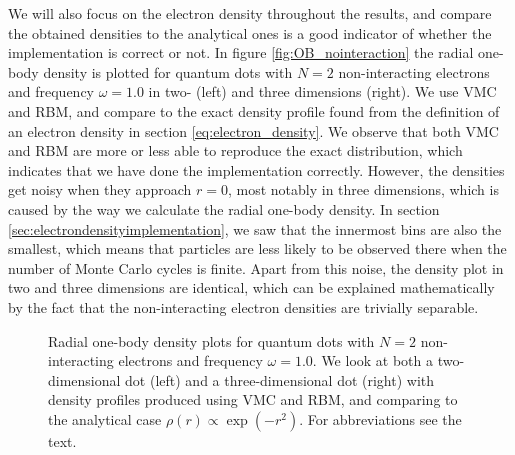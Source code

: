 We will also focus on the electron density throughout the results, and compare the obtained densities to the analytical ones is a good indicator of whether the implementation is correct or not. In figure \eqref{fig:OB_nointeraction} the radial one-body density is plotted for quantum dots with $N=2$ non-interacting electrons and frequency $\omega=1.0$ in two- (left) and three dimensions (right). We use VMC and RBM, and compare to the exact density profile found from the definition of an electron density in section \ref{eq:electron_density}. We observe that both VMC and RBM are more or less able to reproduce the exact distribution, which indicates that we have done the implementation correctly. However, the densities get noisy when they approach $r=0$, most notably in three dimensions, which is caused by the way we calculate the radial one-body density. In section \ref{sec:electrondensityimplementation}, we saw that the innermost bins are also the smallest, which means that particles are less likely to be observed there when the number of Monte Carlo cycles is finite. Apart from this noise, the density plot in two and three dimensions are identical, which can be explained mathematically by the fact that the non-interacting electron densities are trivially separable.

\begin{figure}
	\centering
	\captionsetup[subfigure]{labelformat=empty}
	\caption{Radial one-body density plots for quantum dots with $N=2$ non-interacting electrons and frequency $\omega=1.0$. We look at both a two-dimensional dot (left) and a three-dimensional dot (right) with density profiles produced using VMC and RBM, and comparing to the analytical case $\rho(r)\propto\exp(-r^2)$. For abbreviations see the text.}
	\label{fig:OB_nointeraction}
\end{figure}

